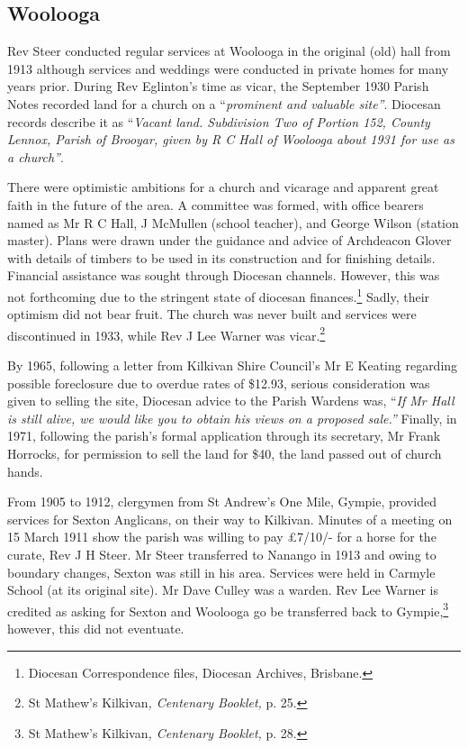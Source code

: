 \subsection{Woolooga}



Rev Steer conducted regular services at Woolooga in the original (old) hall from 1913 although services and weddings were conducted in private homes for many years prior. During Rev Eglinton's time as vicar, the September 1930 Parish Notes recorded land for a church on a ``\emph{prominent and valuable site''}. Diocesan records describe it as ``\emph{Vacant land. Subdivision Two of Portion 152, County Lennox, Parish of Brooyar, given by R C Hall of Woolooga about 1931 for use as a church''}.



There were optimistic ambitions for a church and vicarage and apparent great faith in the future of the area. A committee was formed, with office bearers named as Mr R C Hall, J McMullen (school teacher), and George Wilson (station master). Plans were drawn under the guidance and advice of Archdeacon Glover with details of timbers to be used in its construction and for finishing details. Financial assistance was sought through Diocesan channels. However, this was not forthcoming due to the stringent state of diocesan finances.\footnote{Diocesan Correspondence files, Diocesan Archives, Brisbane.} Sadly, their optimism did not bear fruit. The church was never built and services were discontinued in 1933, while Rev J Lee Warner was vicar.\footnote{St Mathew's Kilkivan\emph{, Centenary Booklet,} p. 25.}


By 1965, following a letter from Kilkivan Shire Council's Mr E Keating regarding possible foreclosure due to overdue rates of \$12.93, serious consideration was given to selling the site, Diocesan advice to the Parish Wardens was, ``\emph{If Mr Hall is still alive, we would like you to obtain his views on a proposed sale.''} Finally, in 1971, following the parish's formal application through its secretary, Mr Frank Horrocks, for permission to sell the land for \$40, the land passed out of church hands.



From 1905 to 1912, clergymen from St Andrew's One Mile, Gympie, provided services for Sexton Anglicans, on their way to Kilkivan. Minutes of a meeting on 15 March 1911 show the parish was willing to pay \pounds7/10/- for a horse for the curate, Rev J H Steer. Mr Steer transferred to Nanango in 1913 and owing to boundary changes, Sexton was still in his area. Services were held in Carmyle School (at its original site). Mr Dave Culley was a warden. Rev Lee Warner is credited as asking for Sexton and Woolooga go be transferred back to Gympie,\footnote{St Mathew's Kilkivan\emph{, Centenary Booklet,} p. 28.} however, this did not eventuate.


